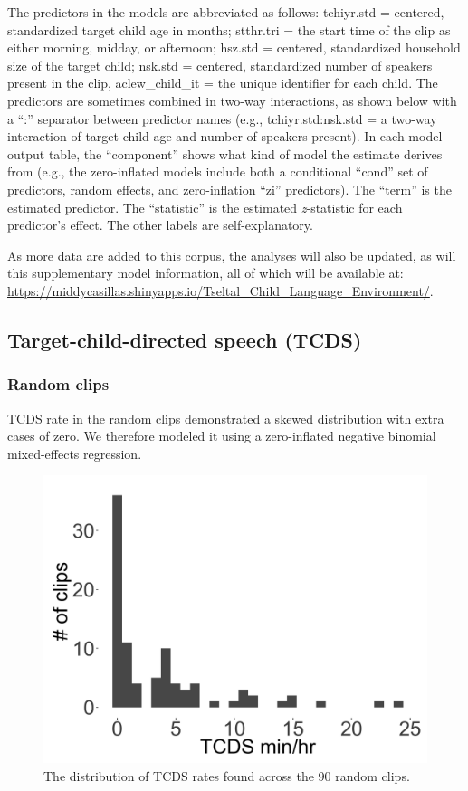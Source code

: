 \documentclass[floatsintext,man]{apa6}
\theoremstyle{definition}
\theoremstyle{definition}
\theoremstyle{definition}
\theoremstyle{remark}
\begin{document}
The predictors in the models are abbreviated as follows: tchiyr.std =
centered, standardized target child age in months; stthr.tri = the start
time of the clip as either morning, midday, or afternoon; hsz.std =
centered, standardized household size of the target child; nsk.std =
centered, standardized number of speakers present in the clip,
aclew\_child\_it = the unique identifier for each child. The predictors
are sometimes combined in two-way interactions, as shown below with a
\enquote{:} separator between predictor names (e.g., tchiyr.std:nsk.std
= a two-way interaction of target child age and number of speakers
present). In each model output table, the \enquote{component} shows what
kind of model the estimate derives from (e.g., the zero-inflated models
include both a conditional \enquote{cond} set of predictors, random
effects, and zero-inflation \enquote{zi} predictors). The \enquote{term}
is the estimated predictor. The \enquote{statistic} is the estimated
\emph{z}-statistic for each predictor's effect. The other labels are
self-explanatory.

As more data are added to this corpus, the analyses will also be
updated, as will this supplementary model information, all of which will
be available at:
\url{https://middycasillas.shinyapps.io/Tseltal_Child_Language_Environment/}.

\subsection{Target-child-directed speech (TCDS)}\label{models-tcds}

\subsubsection{Random clips}\label{models-tcds-random}

TCDS rate in the random clips demonstrated a skewed distribution with
extra cases of zero. We therefore modeled it using a zero-inflated
negative binomial mixed-effects regression.

\FloatBarrier

\begin{figure}[H]

{\centering \includegraphics[width=0.4\linewidth]{www/TCDS_random_distribution} 

}

\caption{The distribution of TCDS rates found across the 90 random clips.}\label{fig:fig1}
\end{figure}
\end{document}
